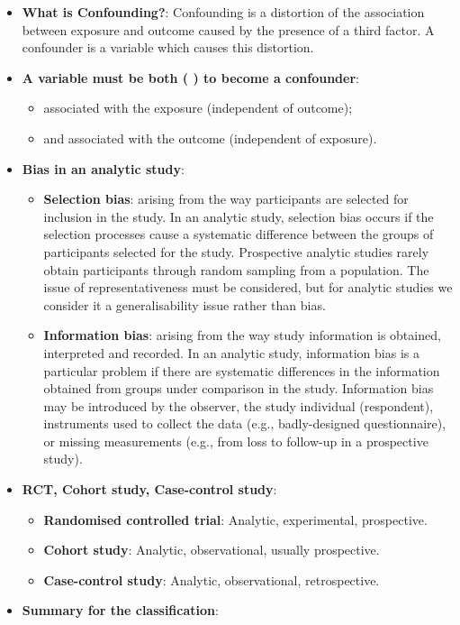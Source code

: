 \documentclass[12pt]{article}
\begin{document}
\begin{itemize}
\item \textbf{What is Confounding?}: Confounding is a distortion of the association between exposure and outcome caused by the presence of a third factor. A confounder is a variable which causes this distortion.
\item \textbf{A variable must be both ( ) to become a confounder}:
    \begin{itemize}
    \item associated with the exposure (independent of outcome);
    \item and associated with the outcome (independent of exposure).
    \end{itemize}
\item \textbf{Bias in an analytic study}:
    \begin{itemize}
    \item \textbf{Selection bias}: arising from the way participants are selected for inclusion in the study. In an analytic study, selection bias occurs if the selection processes cause a systematic difference between the groups of participants selected for the study. Prospective analytic studies rarely obtain participants through random sampling from a population. The issue of representativeness must be considered, but for analytic studies we consider it a generalisability issue rather than bias.
    \item \textbf{Information bias}: arising from the way study information is obtained, interpreted and recorded. In an analytic study, information bias is a particular problem if there are systematic differences in the information obtained from groups under comparison in the study. Information bias may be introduced by the observer, the study individual (respondent), instruments used to collect the data (e.g., badly-designed questionnaire), or missing measurements (e.g., from loss to follow-up in a prospective study).
    \end{itemize}
\item \textbf{RCT, Cohort study, Case-control study}:
    \begin{itemize}
    \item \textbf{Randomised controlled trial}: Analytic, experimental, prospective.
    \item \textbf{Cohort study}: Analytic, observational, usually prospective.
    \item \textbf{Case-control study}: Analytic, observational, retrospective.
    \end{itemize}
\item \textbf{Summary for the classification}:


\end{itemize}
\end{document}

